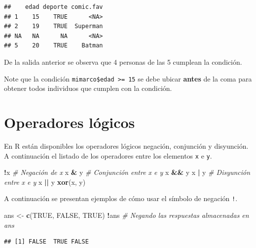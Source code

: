 \documentclass[10pt,]{krantz}
\makeatletter
\newenvironment{Shaded}{\begin{snugshade}}{\end{snugshade}}
\newcommand{\KeywordTok}[1]{\textcolor[rgb]{0.13,0.29,0.53}{\textbf{#1}}}
\newcommand{\StringTok}[1]{\textcolor[rgb]{0.31,0.60,0.02}{#1}}
\newcommand{\CommentTok}[1]{\textcolor[rgb]{0.56,0.35,0.01}{\textit{#1}}}
\newcommand{\OtherTok}[1]{\textcolor[rgb]{0.56,0.35,0.01}{#1}}
\newcommand{\OperatorTok}[1]{\textcolor[rgb]{0.81,0.36,0.00}{\textbf{#1}}}
\newcommand{\NormalTok}[1]{#1}
\newenvironment{kframe}{%
\medskip{}
\setlength{\fboxsep}{.8em}
 \def\at@end@of@kframe{}%
 \ifinner\ifhmode%
  \def\at@end@of@kframe{\end{minipage}}%
  \begin{minipage}{\columnwidth}%
 \fi\fi%
 \def\FrameCommand##1{\hskip\@totalleftmargin \hskip-\fboxsep
 \colorbox{shadecolor}{##1}\hskip-\fboxsep
     \hskip-\linewidth \hskip-\@totalleftmargin \hskip\columnwidth}%
 \MakeFramed {\advance\hsize-\width
   \@totalleftmargin\z@ \linewidth\hsize
   \@setminipage}}%
 {\par\unskip\endMakeFramed%
 \at@end@of@kframe}
\renewenvironment{Shaded}{\begin{kframe}}{\end{kframe}}
\let\BeginKnitrBlock\begin \let\EndKnitrBlock\end
\makeatother
\begin{document}
\begin{verbatim}
##    edad deporte comic.fav
## 1    15    TRUE      <NA>
## 2    19    TRUE  Superman
## NA   NA      NA      <NA>
## 5    20    TRUE    Batman
\end{verbatim}

De la salida anterior se observa que 4 personas de las 5 cumplean la
condición.

\BeginKnitrBlock{rmdwarning}
Note que la condición \texttt{mimarco\$edad\ \textgreater{}=\ 15} se
debe ubicar \textbf{antes} de la coma para obtener todos individuos que
cumplen con la condición.
\EndKnitrBlock{rmdwarning}

\section{\texorpdfstring{Operadores lógicos
}{Operadores lógicos }}\label{operadores-logicos}

En R están disponibles los operadores lógicos negación, conjunción y
disyunción. A continuación el listado de los operadores entre los
elementos \texttt{x} e \texttt{y}.

\begin{Shaded}
\begin{Highlighting}[]
\OperatorTok{!}\NormalTok{x  }\CommentTok{# Negación de x}
\NormalTok{x }\OperatorTok{&}\StringTok{ }\NormalTok{y  }\CommentTok{# Conjunción entre x e y}
\NormalTok{x }\OperatorTok{&&}\StringTok{ }\NormalTok{y}
\NormalTok{x }\OperatorTok{|}\StringTok{ }\NormalTok{y  }\CommentTok{# Disyunción entre x e y}
\NormalTok{x }\OperatorTok{||}\StringTok{ }\NormalTok{y}
\KeywordTok{xor}\NormalTok{(x, y)}
\end{Highlighting}
\end{Shaded}

A continuación se presentan ejemplos de cómo usar el símbolo de negación
\texttt{!}.

\begin{Shaded}
\begin{Highlighting}[]
\NormalTok{ans <-}\StringTok{ }\KeywordTok{c}\NormalTok{(}\OtherTok{TRUE}\NormalTok{, }\OtherTok{FALSE}\NormalTok{, }\OtherTok{TRUE}\NormalTok{)}
\OperatorTok{!}\NormalTok{ans  }\CommentTok{# Negando las respuestas almacenadas en ans}
\end{Highlighting}
\end{Shaded}

\begin{verbatim}
## [1] FALSE  TRUE FALSE
\end{verbatim}
\end{document}
